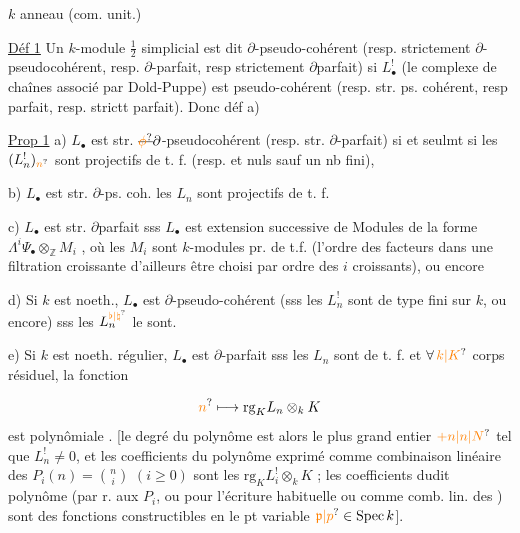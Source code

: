 

$k$ anneau (com. unit.)

\uline{Déf 1} Un $k$-module $\frac12$ simplicial  est dit $\partial$-pseudo-cohérent (resp. strictement $\partial$-pseudocohérent, resp. $\partial$-parfait, resp strictement $\partial$parfait) si $L_\bullet^!$ (le complexe de chaînes associé par Dold-Puppe) est pseudo-cohérent (resp. str. ps. cohérent, resp parfait, resp. strictt parfait). Donc  déf a) 

\uline{Prop 1} a) $L_\bullet$ est str. $\deleted{\unsure{\phi}}\partial$-pseudocohérent (resp. str. $\partial$-parfait) si et seulmt si les $(L_n^!)_{\unsure{n}}$ sont projectifs de t. f. (resp. et nuls sauf un nb fini), 

b) $L_\bullet$ est str. $\partial$-ps. coh.  les $L_n$ sont projectifs de t. f.

c) $L_\bullet$ est str. $\partial$parfait sss $L_\bullet$ est extension successive  de Modules de la forme $\Lambda^i\Psi_\bullet\otimes_{\mathbb Z}M_i$ , où les $M_i$ sont $k$-modules pr. de t.f. (l'ordre des facteurs dans une filtration croissante  d'ailleurs être choisi par ordre des $i$ croissants), ou encore  

d) Si $k$ est noeth., $L_\bullet$ est $\partial$-pseudo-cohérent (sss les $L_n^!$ sont de type fini sur $k$, ou encore) sss les $L_n^{\unsure{\flat|\natural}}$ le sont.

e) Si $k$ est noeth. régulier, $L_\bullet$ est $\partial$-parfait sss les $L_n$ sont de t. f. et  $\forall\,\unsure{k|K}$ corps résiduel, la fonction

\[
\unsure{n}\longmapsto\mathrm{rg}_K L_n\otimes_k K
\]
est polynômiale . [le degré du polynôme  est alors le plus grand entier $\unsure{+n|n|N}$ tel que $L_n^!\ne0$, et les coefficients du polynôme exprimé comme combinaison linéaire des $P_i(n)=\binom n i$ $(i\geq0)$ sont les $\mathrm{rg}_K L_i^!\otimes_k K$ ; les coefficients dudit polynôme (par r. aux $P_i$, ou pour l'écriture habituelle  ou comme comb. lin. des ) sont des fonctions constructibles en le pt variable $\unsure{\mathfrak p|p}\in\operatorname{Spec} k$].

